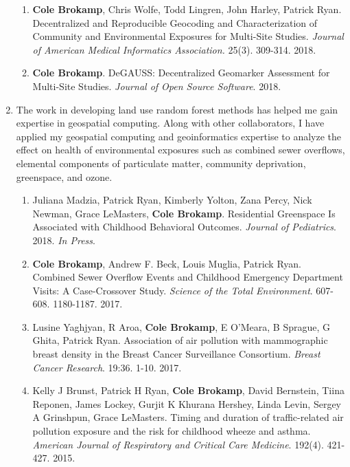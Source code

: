\documentclass{nihbiosketch}
\begin{document}
\begin{enumerate}
\begin{enumerate}
	
	\item \textbf{Cole Brokamp}, Chris Wolfe, Todd Lingren, John Harley, Patrick Ryan. Decentralized and Reproducible Geocoding and Characterization of Community and Environmental Exposures for Multi-Site Studies. \textit{Journal of American Medical Informatics Association.} 25(3). 309-314. 2018.
	
	\item \textbf{Cole Brokamp}. DeGAUSS: Decentralized Geomarker Assessment for Multi-Site Studies. \textit{Journal of Open Source Software}. 2018. 
	
\end{enumerate}

\item The work in developing land use random forest methods has helped me gain expertise in geospatial computing.  Along with other collaborators, I have applied my geospatial computing and geoinformatics expertise to analyze the effect on health of environmental exposures such as combined sewer overflows, elemental components of particulate matter, community deprivation, greenspace, and ozone.

\begin{enumerate}

 \item Juliana Madzia, Patrick Ryan, Kimberly Yolton, Zana Percy, Nick Newman, Grace
LeMasters, \textbf{Cole Brokamp}. Residential Greenspace Is Associated with Childhood
Behavioral Outcomes. \textit{Journal of Pediatrics}. 2018.	\textit{In Press}.

	\item \textbf{Cole Brokamp}, Andrew F. Beck, Louis Muglia, Patrick Ryan. Combined Sewer Overflow Events and Childhood Emergency Department Visits: A Case-Crossover Study. \textit{Science of the Total Environment}. 607-608. 1180-1187. 2017.
	
	\item Lusine Yaghjyan, R Aroa, \textbf{Cole Brokamp}, E O'Meara, B Sprague, G Ghita, Patrick Ryan. Association of air pollution with mammographic breast density in the Breast Cancer Surveillance Consortium. \textit{Breast Cancer Research}. 19:36. 1-10. 2017.
	
	\item Kelly J Brunst, Patrick H Ryan, \textbf{Cole Brokamp}, David Bernstein, Tiina Reponen, James Lockey, Gurjit K Khurana Hershey, Linda Levin, Sergey A Grinshpun, Grace LeMasters. Timing and duration of traffic-related air pollution exposure and the risk for childhood wheeze and asthma. \textit{American Journal of Respiratory and Critical Care Medicine}. 192(4). 421-427. 2015.
	

\end{enumerate}
\end{enumerate}
\end{document}
